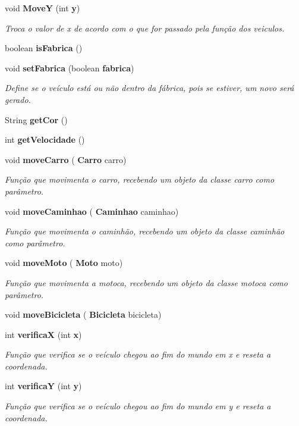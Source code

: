 \begin{DoxyCompactItemize}
void \textbf{ MoveY} (int \textbf{ y})
\begin{DoxyCompactList}\small\item\em Troca o valor de x de acordo com o que for passado pela função dos veiculos. \end{DoxyCompactList}\item 
boolean \textbf{ is\+Fabrica} ()
\item 
void \textbf{ set\+Fabrica} (boolean \textbf{ fabrica})
\begin{DoxyCompactList}\small\item\em Define se o veículo está ou não dentro da fábrica, pois se estiver, um novo será gerado. \end{DoxyCompactList}\item 
String \textbf{ get\+Cor} ()
\item 
int \textbf{ get\+Velocidade} ()
\item 
void \textbf{ move\+Carro} (\textbf{ Carro} carro)
\begin{DoxyCompactList}\small\item\em Função que movimenta o carro, recebendo um objeto da classe carro como parâmetro. \end{DoxyCompactList}\item 
void \textbf{ move\+Caminhao} (\textbf{ Caminhao} caminhao)
\begin{DoxyCompactList}\small\item\em Função que movimenta o caminhão, recebendo um objeto da classe caminhão como parâmetro. \end{DoxyCompactList}\item 
void \textbf{ move\+Moto} (\textbf{ Moto} moto)
\begin{DoxyCompactList}\small\item\em Função que movimenta a motoca, recebendo um objeto da classe motoca como parâmetro. \end{DoxyCompactList}\item 
void \textbf{ move\+Bicicleta} (\textbf{ Bicicleta} bicicleta)
\item 
int \textbf{ verificaX} (int \textbf{ x})
\begin{DoxyCompactList}\small\item\em Função que verifica se o veículo chegou ao fim do mundo em x e reseta a coordenada. \end{DoxyCompactList}\item 
int \textbf{ verificaY} (int \textbf{ y})
\begin{DoxyCompactList}\small\item\em Função que verifica se o veículo chegou ao fim do mundo em y e reseta a coordenada. \end{DoxyCompactList}\end{DoxyCompactItemize}
